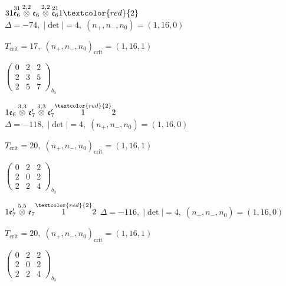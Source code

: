 \documentclass[10pt]{article}
\begin{document}
$31\overset{31}{\mathfrak{e}_6}\overset{2,2}{\otimes}\mathfrak{e}_6\overset{2,2}{\otimes}\overset{21}{\mathfrak{e}_6}1\textcolor{red}{2}$ \quad $\Delta=-74,\; |\det|=4,\; (n_+,n_-,n_0)=(1,16,0)$

\hspace{1em}$T_{\text{crit}}=17,\; (n_+,n_-,n_0)_{\text{crit}}=(1,16,1)$

\hspace{2em}$\left(\begin{smallmatrix}0 & 2 & 2 \\ 2 & 3 & 5 \\ 2 & 5 & 7\end{smallmatrix}\right)_{\!b_0}$

\smallskip

$1\mathfrak{e}_6\overset{3,3}{\otimes}\mathfrak{e}_7'\overset{3,3}{\otimes}\mathfrak{e}_7'\overset{\textcolor{red}{2}}{1}2$ \quad $\Delta=-118,\; |\det|=4,\; (n_+,n_-,n_0)=(1,16,0)$

\hspace{1em}$T_{\text{crit}}=20,\; (n_+,n_-,n_0)_{\text{crit}}=(1,16,1)$

\hspace{2em}$\left(\begin{smallmatrix}0 & 2 & 2 \\ 2 & 0 & 2 \\ 2 & 2 & 4\end{smallmatrix}\right)_{\!b_0}$

\smallskip

$1\mathfrak{e}_7'\overset{5,5}{\otimes}\mathfrak{e}_7\overset{\textcolor{red}{2}}{1}2$ \quad $\Delta=-116,\; |\det|=4,\; (n_+,n_-,n_0)=(1,16,0)$

\hspace{1em}$T_{\text{crit}}=20,\; (n_+,n_-,n_0)_{\text{crit}}=(1,16,1)$

\hspace{2em}$\left(\begin{smallmatrix}0 & 2 & 2 \\ 2 & 0 & 2 \\ 2 & 2 & 4\end{smallmatrix}\right)_{\!b_0}$

\smallskip
\end{document}
